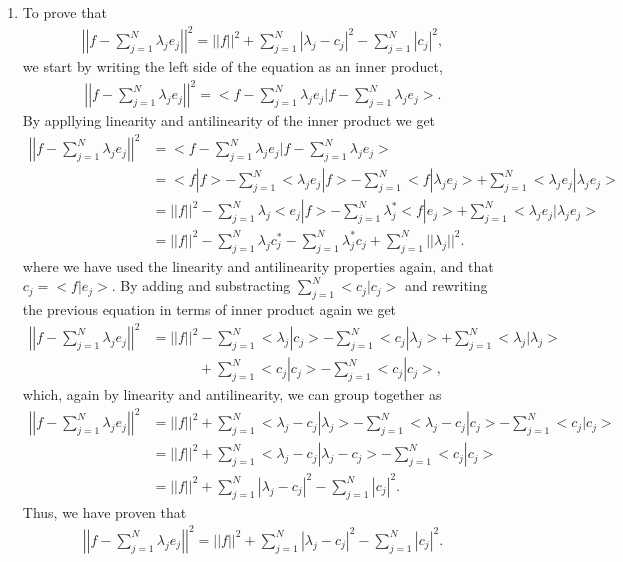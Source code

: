 \begin{enumerate}[label=(\alph*)]
\item To prove that
\begin{align*}
\left|\left|f-\sum_{j=1}^N\lambda_je_j\right|\right|^2=||f||^2+\sum_{j=1}^N|\lambda_j-c_j|^2-\sum_{j=1}^N|c_j|^2,
\end{align*}
we start by writing the left side of the equation as an inner product,
\begin{align*}
\left|\left|f-\sum_{j=1}^N\lambda_je_j\right|\right|^2=<f-\sum_{j=1}^N\lambda_je_j|f-\sum_{j=1}^N\lambda_je_j>.
\end{align*}
By appllying linearity and antilinearity of the inner product we get
\begin{align*}
\left|\left|f-\sum_{j=1}^N\lambda_je_j\right|\right|^2&=<f-\sum_{j=1}^N\lambda_je_j|f-\sum_{j=1}^N\lambda_je_j>\\
&=<f|f>-\sum_{j=1}^N<\lambda_je_j|f>-\sum_{j=1}^N<f|\lambda_je_j>+\sum_{j=1}^N<\lambda_je_j|\lambda_je_j>\\
&=||f||^2-\sum_{j=1}^N\lambda_j<e_j|f>-\sum_{j=1}^N\lambda_j^*<f|e_j>+\sum_{j=1}^N<\lambda_je_j|\lambda_je_j>\\
&=||f||^2-\sum_{j=1}^N\lambda_jc_j^*-\sum_{j=1}^N\lambda_j^*c_j+\sum_{j=1}^N||\lambda_j||^2.
\end{align*}
where we have used the linearity and antilinearity properties again, and that $c_j=<f|e_j>$. By adding and substracting $\sum_{j=1}^N<c_j|c_j>$ and rewriting the previous equation in terms of inner product again we get
\begin{align*}
\left|\left|f-\sum_{j=1}^N\lambda_je_j\right|\right|^2&=||f||^2-\sum_{j=1}^N<\lambda_j|c_j>-\sum_{j=1}^N<c_j|\lambda_j>+\sum_{j=1}^N<\lambda_j|\lambda_j>\\
&~~~~~~~~~~~~~~~+\sum_{j=1}^N<c_j|c_j>-\sum_{j=1}^N<c_j|c_j>,
\end{align*}
which, again by linearity and antilinearity, we can group together as
\begin{align*}
\left|\left|f-\sum_{j=1}^N\lambda_je_j\right|\right|^2&=||f||^2+\sum_{j=1}^N<\lambda_j-c_j|\lambda_j>-\sum_{j=1}^N<\lambda_j-c_j|c_j>-\sum_{j=1}^N<c_j|c_j>\\
&=||f||^2+\sum_{j=1}^N<\lambda_j-c_j|\lambda_j-c_j>-\sum_{j=1}^N<c_j|c_j>\\
&=||f||^2+\sum_{j=1}^N|\lambda_j-c_j|^2-\sum_{j=1}^N|c_j|^2.
\end{align*}
Thus, we have proven that
\begin{align*}
\left|\left|f-\sum_{j=1}^N\lambda_je_j\right|\right|^2=||f||^2+\sum_{j=1}^N|\lambda_j-c_j|^2-\sum_{j=1}^N|c_j|^2.

\end{align*}
\end{enumerate}
